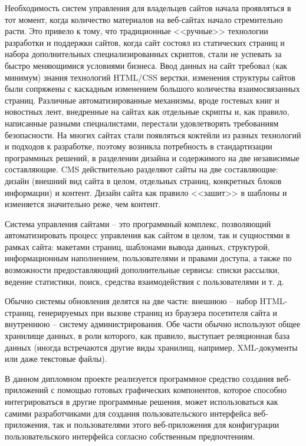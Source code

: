 Необходимость систем управления для владельцев сайтов начала проявляться в тот момент, когда количество материалов на веб-сайтах начало стремительно расти. Это привело к тому, что традиционные <<ручные>> технологии разработки и поддержки сайтов, когда сайт состоял из статических страниц и набора дополнительных специализированных скриптов, стали не успевать за быстро меняющимися условиями бизнеса. Ввод данных на сайт требовал (как минимум) знания технологий HTML/CSS верстки, изменения структуры сайтов были сопряжены с каскадным изменением большого количества взаимосвязанных страниц. Различные автоматизированные механизмы, вроде гостевых книг и новостных лент, внедренные на сайтах как отдельные скрипты и, как правило, написанные разными специалистами, перестали удовлетворять требованиям безопасности. На многих сайтах стали появляться коктейли из разных технологий и подходов к разработке, поэтому возникла потребность в стандартизации программных решений, в разделении дизайна и содержимого на две независимые составляющие. CMS действительно разделяют сайты на две составляющие: дизайн (внешний вид сайта в целом, отдельных страниц, конкретных блоков информации) и контент. Дизайн сайта как правило <<зашит>> в шаблоны и изменяется значительно реже, чем контент.

Система управления сайтами – это программный комплекс, позволяющий автоматизировать процесс управления как сайтом в целом, так и сущностями в рамках сайта: макетами страниц, шаблонами вывода данных, структурой, информационным наполнением, пользователями и правами доступа, а также по возможности предоставляющий дополнительные сервисы: списки рассылки, ведение статистики, поиск, средства взаимодействия с пользователями и т. д.

Обычно системы обновления делятся на две части: внешнюю – набор HTML-страниц, генерируемых при вызове страниц из браузера посетителя сайта и внутреннюю – систему администрирования. Обе части обычно используют общее хранилище данных, в роли которого, как правило, выступает реляционная база данных (иногда встречаются другие виды хранилищ, например, XML-документы или даже текстовые файлы).

В данном дипломном проекте реализуется программное средство создания веб-приложений с помощью готовых графических компонентов, которое способно интегрироваться в другие программные решения, может использоваться как самими разработчиками для создания пользовательского интерфейса веб-приложения, так и пользователями этого веб-приложения для конфигурации пользовательского интерфейса согласно собственным предпочтениям.

